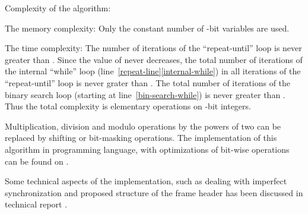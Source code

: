 \documentclass{article}
\begin{document}
Complexity of the algorithm:

The memory complexity: Only the constant number of -bit variables are used.

The time complexity: The number of iterations of the ``repeat-until'' loop is
never greater than . Since the value of  never decreases, the total
number of iterations of the internal ``while'' loop
(line~\ref{repeat-line}\ref{internal-while}) in all iterations of the
``repeat-until'' loop is never grater than . The total number of
iterations of the binary search loop (starting at line~\ref{bin-search-while})
is never greater than . Thus the total complexity is  elementary
operations on -bit integers.

Multiplication, division and modulo operations by the powers of two can be
replaced by shifting or bit-masking operations. The implementation of this
algorithm in programming language, with optimizations of bit-wise operations
can be found on {\cite{RBO-WWW}}.

Some technical aspects of the implementation, such as dealing with imperfect
synchronization and proposed structure of the frame header has been discussed
in technical report {\cite{DBLP:journals/corr/abs-1108-5095}}.
\end{document}
